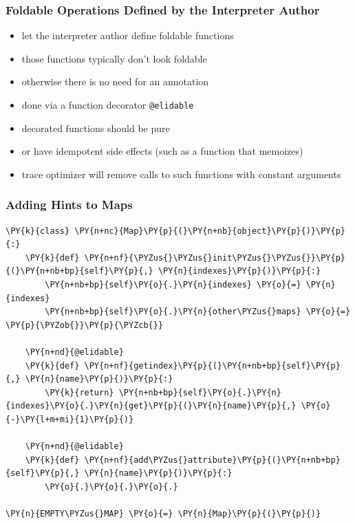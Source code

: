 \documentclass[utf8x]{beamer}
\begin{document}
\begin{frame}
  \frametitle{Foldable Operations Defined by the Interpreter Author}
  \begin{itemize}
      \item let the interpreter author define foldable functions
      \item those functions typically don't look foldable
      \item otherwise there is no need for an annotation
      \item done via a function decorator \texttt{@elidable}
      \pause
      \item decorated functions should be pure
      \item or have idempotent side effects (such as a function that memoizes)
      \item trace optimizer will remove calls to such functions with constant arguments
  \end{itemize}
\end{frame}

\begin{frame}[containsverbatim]
\frametitle{Adding Hints to Maps}

\begin{Verbatim}[commandchars=\\\{\}]
\PY{k}{class} \PY{n+nc}{Map}\PY{p}{(}\PY{n+nb}{object}\PY{p}{)}\PY{p}{:}
    \PY{k}{def} \PY{n+nf}{\PYZus{}\PYZus{}init\PYZus{}\PYZus{}}\PY{p}{(}\PY{n+nb+bp}{self}\PY{p}{,} \PY{n}{indexes}\PY{p}{)}\PY{p}{:}
        \PY{n+nb+bp}{self}\PY{o}{.}\PY{n}{indexes} \PY{o}{=} \PY{n}{indexes}
        \PY{n+nb+bp}{self}\PY{o}{.}\PY{n}{other\PYZus{}maps} \PY{o}{=} \PY{p}{\PYZob{}}\PY{p}{\PYZcb{}}

    \PY{n+nd}{@elidable}
    \PY{k}{def} \PY{n+nf}{getindex}\PY{p}{(}\PY{n+nb+bp}{self}\PY{p}{,} \PY{n}{name}\PY{p}{)}\PY{p}{:}
        \PY{k}{return} \PY{n+nb+bp}{self}\PY{o}{.}\PY{n}{indexes}\PY{o}{.}\PY{n}{get}\PY{p}{(}\PY{n}{name}\PY{p}{,} \PY{o}{-}\PY{l+m+mi}{1}\PY{p}{)}

    \PY{n+nd}{@elidable}
    \PY{k}{def} \PY{n+nf}{add\PYZus{}attribute}\PY{p}{(}\PY{n+nb+bp}{self}\PY{p}{,} \PY{n}{name}\PY{p}{)}\PY{p}{:}
        \PY{o}{.}\PY{o}{.}\PY{o}{.}

\PY{n}{EMPTY\PYZus{}MAP} \PY{o}{=} \PY{n}{Map}\PY{p}{(}\PY{p}{)}
\end{Verbatim}
\end{frame}
\end{document}

